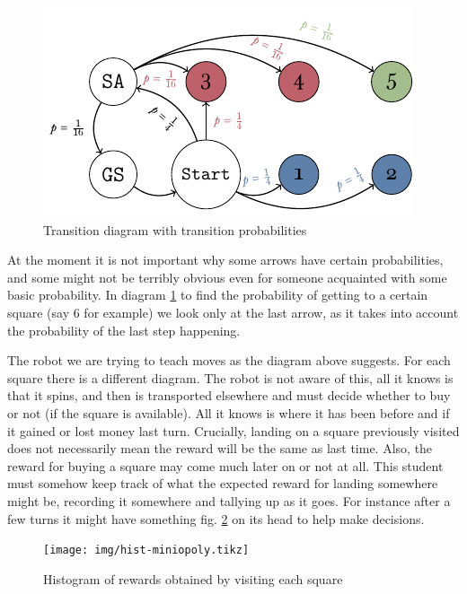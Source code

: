 \begin{figure}[h]
	\centering
	\includegraphics[width=\textwidth]{img/transicion-markov.pdf}
	\caption{Transition diagram with transition probabilities}
	\label{fig:miniopoly-transicion-markov}
\end{figure}

At the moment it is not important why some arrows have certain 
probabilities, and some might not be terribly obvious even for 
someone acquainted with some basic probability. In diagram 
\ref{fig:miniopoly-transicion-markov} to find the probability 
of getting to a certain square (say 6 for example) we look only 
at the last arrow, as it takes into account the probability of 
the last step happening.

The robot we are trying to teach moves as the diagram above 
suggests. For each square there is a different diagram. The 
robot is not aware of this, all it knows is that it spins, and 
then is transported elsewhere and must decide whether to buy or 
not (if the square is available). All it knows is where it has 
been before and if it gained or lost money last turn. 
Crucially, landing on a square previously visited does not 
necessarily mean the reward will be the same as last time. 
Also, the reward for buying a square may come much later on or 
not at all. This student must somehow keep track of what the 
expected reward for landing somewhere might be, recording it 
somewhere and tallying up as it goes. For instance after a few 
turns it might have something fig. \ref{fig:hist-miniopoly} on 
its head to help make decisions.

\begin{figure}
\centering
\texttt{[image: img/hist-miniopoly.tikz]}
\label{fig:hist-miniopoly}
\caption{Histogram of rewards obtained by visiting each square}
\end{figure}


